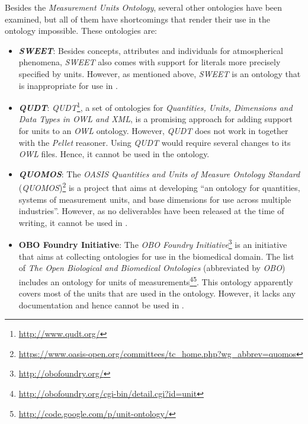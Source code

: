 Besides the \emph{Measurement Units Ontology}, several other ontologies have been examined, but all of them have shortcomings that render their use in the \thinkhomeweather ontology impossible. These ontologies are:
\begin{itemize}
  \item \textbf{\emph{SWEET}}: Besides concepts, attributes and individuals for atmospherical phenomena, \emph{SWEET} also comes with support for literals more precisely specified by units. However, as mentioned above, \emph{SWEET} is an ontology that is inappropriate for use in \thinkhomeweather.
  
  \item \textbf{\emph{QUDT}}: \emph{QUDT}\footnote{\href{http://www.qudt.org/}{http://www.qudt.org/}}, a set of ontologies for \emph{Quantities, Units, Dimensions and Data Types in OWL and XML}, is a promising approach for adding support for units to an \emph{OWL} ontology. However, \emph{QUDT} does not work in \protege together with the \emph{Pellet} reasoner. Using \emph{QUDT} would require several changes to its \emph{OWL} files. Hence, it cannot be used in the \thinkhomeweather ontology.
  
  \item \textbf{\emph{QUOMOS}}: The \emph{OASIS Quantities and Units of Measure Ontology Standard} (\emph{QUOMOS})\footnote{\href{https://www.oasis-open.org/committees/tc\_home.php?wg\_abbrev=quomos}{https://www.oasis-open.org/committees/tc\_home.php?wg\_abbrev=quomos}} is a project that aims at developing ``an ontology for quantities, systems of measurement units, and base dimensions for use across multiple industries''. However, as no deliverables have been released at the time of writing, it cannot be used in \thinkhomeweather.
  
  \item \textbf{OBO Foundry Initiative}: The \emph{OBO Foundry Initiative}\footnote{\href{http://obofoundry.org/}{http://obofoundry.org/}} is an initiative that aims at collecting ontologies for use in the biomedical domain. The list of \emph{The Open Biological and Biomedical Ontologies} (abbreviated by \emph{OBO}) includes an ontology for units of measurements\footnote{\href{http://obofoundry.org/cgi-bin/detail.cgi?id=unit}{http://obofoundry.org/cgi-bin/detail.cgi?id=unit}}\footnote{\href{http://code.google.com/p/unit-ontology/}{http://code.google.com/p/unit-ontology/}}. This ontology apparently covers most of the units that are used in the \thinkhomeweather ontology. However, it lacks any documentation and hence cannot be used in \thinkhomeweather.
  

\end{itemize}
